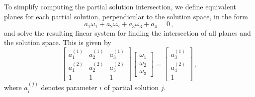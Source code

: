 \documentclass[letterpaper, 10 pt, conference]{ieeeconf}  %
\providecommand{\DIFaddbegin}{} %
\providecommand{\DIFaddend}{} %
\providecommand{\DIFdelbegin}{} %
\providecommand{\DIFdelend}{} %
\begin{document}
To simplify computing the partial solution intersection, we define equivalent planes for each partial solution, perpendicular to the solution space, in the form
\begin{equation}
   a_1\omega_1 + a_2\omega_2 +a_3\omega_3 + a_4 = 0\,, \label{eqn:3sen_plane_eq}
\end{equation}
and solve the resulting linear system for finding the intersection of all planes and the solution space. This is given by
\begin{equation}
   \begin{bmatrix}
      a_1^{(1)} & a_2^{(1)} & a_3^{(1)} \\
      a_1^{(2)} & a_2^{(2)} & a_3^{(2)} \\
      1 & 1 & 1
   \end{bmatrix}
   \begin{bmatrix}
      \omega_1 \\
      \omega_2 \\
      \omega_3
   \end{bmatrix}
   =
   \DIFdelbegin %
\DIFdelend \DIFaddbegin \begin{bmatrix}
      a_3^{(1)} \\
      a_4^{(2)} \\
      1
   \end{bmatrix}\DIFaddend \,, \label{eqn:3sen_plane_sol_eq}
\end{equation}
where $a_i^{(j)}$ denotes parameter $i$ of partial solution $j$.
\end{document}
